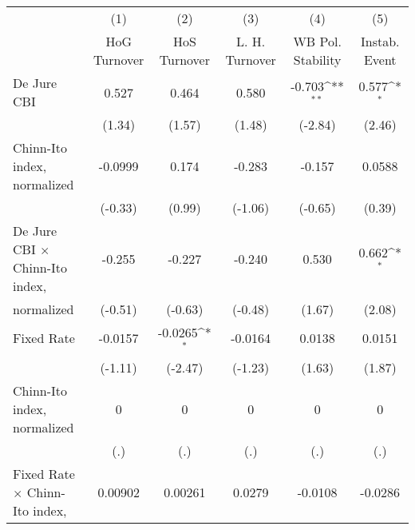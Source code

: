 \begin{table}[htbp]\centering
\def\sym#1{\ifmmode^{#1}\else\(^{#1}\)\fi}
\caption{\label{ikmultIndFEDJ}}
\begin{tabular}{l*{5}{c}}
\toprule
                                        &\multicolumn{1}{c}{(1)}&\multicolumn{1}{c}{(2)}&\multicolumn{1}{c}{(3)}&\multicolumn{1}{c}{(4)}&\multicolumn{1}{c}{(5)}\\
                                        &\multicolumn{1}{c}{HoG Turnover}&\multicolumn{1}{c}{HoS Turnover}&\multicolumn{1}{c}{L. H. Turnover}&\multicolumn{1}{c}{WB Pol. Stability}&\multicolumn{1}{c}{Instab. Event}\\
\midrule
De Jure CBI                             &    0.527         &    0.464         &    0.580         &   -0.703\sym{**} &    0.577\sym{*}  \\
                                        &   (1.34)         &   (1.57)         &   (1.48)         &  (-2.84)         &   (2.46)         \\
\addlinespace
Chinn-Ito index, normalized             &  -0.0999         &    0.174         &   -0.283         &   -0.157         &   0.0588         \\
                                        &  (-0.33)         &   (0.99)         &  (-1.06)         &  (-0.65)         &   (0.39)         \\
\addlinespace
De Jure CBI $\times$ Chinn-Ito index,   &   -0.255         &   -0.227         &   -0.240         &    0.530         &    0.662\sym{*}  \\
normalized                              &  (-0.51)         &  (-0.63)         &  (-0.48)         &   (1.67)         &   (2.08)         \\
\addlinespace
Fixed Rate                              &  -0.0157         &  -0.0265\sym{*}  &  -0.0164         &   0.0138         &   0.0151         \\
                                        &  (-1.11)         &  (-2.47)         &  (-1.23)         &   (1.63)         &   (1.87)         \\
\addlinespace
Chinn-Ito index, normalized             &        0         &        0         &        0         &        0         &        0         \\
                                        &      (.)         &      (.)         &      (.)         &      (.)         &      (.)         \\
\addlinespace
Fixed Rate $\times$ Chinn-Ito index,    &  0.00902         &  0.00261         &   0.0279         &  -0.0108         &  -0.0286         \\

\end{tabular}
\end{table}
